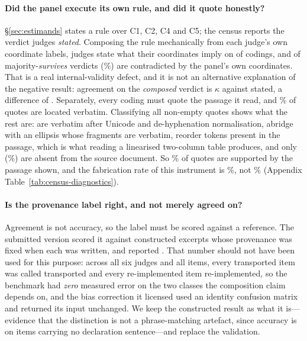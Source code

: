 \documentclass[11pt]{article}
\begin{document}
\paragraph{Did the panel execute its own rule, and did it quote honestly?}
\S\ref{sec:estimands} states a rule over C1, C2, C4 and C5; the census reports
the verdict judges \emph{stated}. Composing the rule mechanically from each
judge's own coordinate labels, judges state what their coordinates imply on
\RuleFidelity{} of codings, and \RuleSurvivesContraN{} of \RuleSurvivesN{}
majority-\emph{survives} verdicts (\RuleSurvivesContra\%) are contradicted by
the panel's own coordinates. That is a real internal-validity defect, and it is
not an alternative explanation of the negative result: agreement on the
\emph{composed} verdict is $\kappa$ \RuleKComposed{} against \RuleKStated{}
stated, a difference of \RuleKDiff{} \RuleKDiffCI{}. Separately, every coding
must quote the passage it read, and \CensusQuoteRate\% of quotes are located
verbatim. Classifying all \QFNonEmpty{} non-empty quotes shows what the rest
are: \QFNormalised{} are verbatim after Unicode and de-hyphenation
normalisation, \QFElision{} abridge with an ellipsis whose fragments are
verbatim, \QFReserial{} reorder tokens present in the passage, which is what
reading a linearised two-column table produces, and only \QFAbsent{}
(\QFAbsentPct\%) are absent from the source document. So \QFSupported\% of
quotes are supported by the passage shown, and the fabrication rate of this
instrument is \QFAbsentPct\%, not \QFOtherPct\% (Appendix
Table~\ref{tab:census-diagnostics}).

\paragraph{Is the provenance label right, and not merely agreed on?}
Agreement is not accuracy, so the label must be scored against a reference. The
submitted version scored it against constructed excerpts whose provenance was
fixed when each was written, and reported \PvAcc{}. That number should not have
been used for this purpose: across all six judges and all items, every
transported item was called transported and every re-implemented item
re-implemented, so the benchmark had \emph{zero} measured error on the two
classes the composition claim depends on, and the bias correction it licensed
used an identity confusion matrix and returned its input unchanged. We keep the
constructed result as what it is---evidence that the distinction is not a
phrase-matching artefact, since accuracy is \PvImplicit{} on items carrying no
declaration sentence---and replace the validation.
\end{document}
